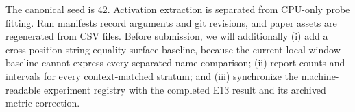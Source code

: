 \documentclass{article}
\begin{document}
The canonical seed is 42. Activation extraction is separated from CPU-only probe fitting. Run manifests record arguments and git revisions, and paper assets are regenerated from CSV files. Before submission, we will additionally (i) add a cross-position string-equality surface baseline, because the current local-window baseline cannot express every separated-name comparison; (ii) report counts and intervals for every context-matched stratum; and (iii) synchronize the machine-readable experiment registry with the completed E13 result and its archived metric correction.



\end{document}
